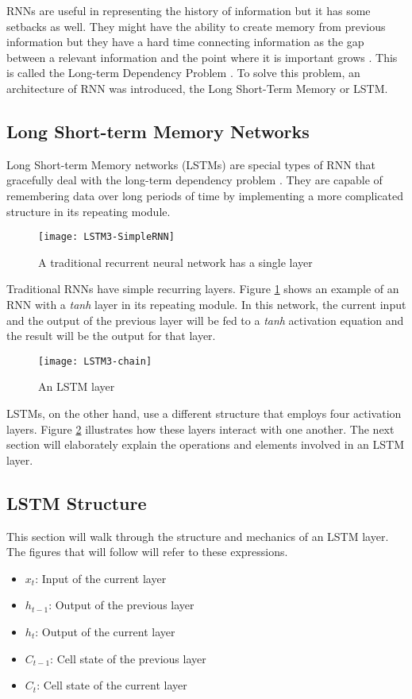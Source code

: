     RNNs are useful in representing the history of information but it has some setbacks as well. They might have the ability to create memory from previous information but they have a hard time connecting information as the gap between a relevant information and the point where it is important grows \cite{graves2012supervised}. This is called the Long-term Dependency Problem \cite{bengio1994learning}. To solve this problem, an architecture of RNN was introduced, the Long Short-Term Memory or LSTM.

\subsection{Long Short-term Memory Networks}
    Long Short-term Memory networks (LSTMs) are special types of RNN that gracefully deal with the long-term dependency problem \cite{hochreiter1997long}. They are capable of remembering data over long periods of time by implementing a more complicated structure in its repeating module.

    \begin{figure}[H]
    \centering
    \texttt{[image: LSTM3-SimpleRNN]}
    \caption{A traditional recurrent neural network has a single layer \cite{olah2015understanding}}
    \label{fig:rnn}
    \end{figure}
    Traditional RNNs have simple recurring layers. Figure \ref{fig:rnn} shows an example of an RNN with a \textit{tanh} layer in its repeating module. In this network, the current input and the output of the previous layer will be fed to a \textit{tanh} activation equation and the result will be the output for that layer.
    
    \begin{figure}[H]
    \centering
    \texttt{[image: LSTM3-chain]}
    \caption{An LSTM layer \cite{olah2015understanding}}
    \label{fig:chain}
    \end{figure}
    LSTMs, on the other hand, use a different structure that employs four activation layers. Figure \ref{fig:chain} illustrates how these layers interact with one another. The next section will elaborately explain the operations and elements involved in an LSTM layer.

\subsection{LSTM Structure}
    This section will walk through the structure and mechanics of an LSTM layer. The figures that will follow will refer to these expressions.
        \begin{itemize}
        \item \( x_t \): Input of the current layer
        \item \( h_{t-1} \): Output of the previous layer
        \item \( h_t \): Output of the current layer
        \item \( C_{t-1} \): Cell state of the previous layer
        \item \( C_t \): Cell state of the current layer
        \end{itemize}

